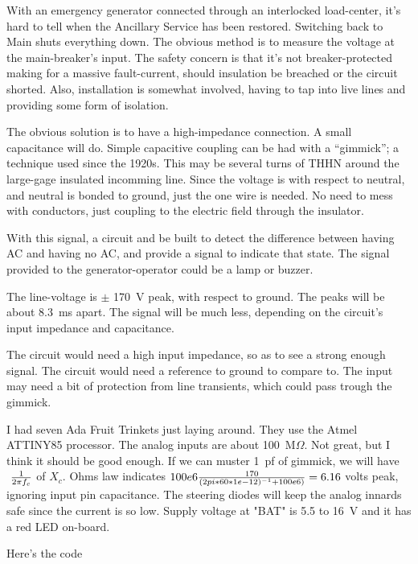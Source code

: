 

With an emergency generator connected through an interlocked load-center, it's
hard to tell when the Ancillary Service has been restored. Switching back to
Main shuts everything down.
The obvious method is to measure the voltage at the main-breaker's input.
The safety concern is that it's not breaker-protected making for a massive
fault-current,
should insulation be breached or the circuit shorted.
Also, installation is somewhat involved, having to tap into live lines and
providing some form of isolation.

The obvious solution is to have a high-impedance connection.
A small capacitance will do.
Simple capacitive coupling can be had with a ``gimmick''; a technique used
since the
1920s.
This may be several turns of THHN around the large-gage insulated incomming
line.
Since the voltage is with respect to neutral, and neutral is bonded to ground,
just the one wire is needed.
No need to mess with conductors, just coupling to the electric field through
the insulator.

With this signal, a circuit and be built to detect the difference between
having AC and having no AC,
and provide a signal to indicate that state.
The signal provided to the generator-operator could be a lamp or buzzer.

The line-voltage is $\pm$ 170~V peak, with respect to ground.
The peaks will be about 8.3~ms apart.
The signal will be much less, depending on the circuit's input impedance and
capacitance.

The circuit would need a high input impedance, so as to see a strong enough
signal.
The circuit would need a reference to ground to compare to.
The input may need a bit of protection from line transients, which could pass
trough the gimmick.

\fi

I had seven Ada Fruit Trinkets just laying around. They use the Atmel
ATTINY85 processor. The analog inputs are about 100~M$\Omega$. Not great, but
I think it should be good enough. If we can muster 1~pf of gimmick, we will
have $\ {1 \over 2 \pi f_c} $ of $X_c$. Ohms law indicates
$100e6 {170 \over  {(2pi*60*1e-12)^{-1} + 100e6)} } = 6.16 $ volts peak,
ignoring
input pin capacitance. The steering diodes will keep the analog innards safe
since the current is so low. Supply voltage at "BAT" is 5.5 to 16~V and it has
a red LED on-board.

\fi

Here's the code

